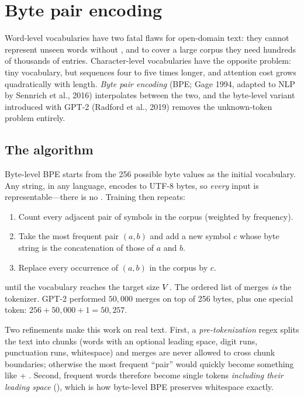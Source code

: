 \section{Byte pair encoding}\label{sec:text:bpe}

Word-level vocabularies have two fatal flaws for open-domain text: they cannot represent unseen
words without , and to cover a large corpus they need hundreds of thousands of entries.
Character-level vocabularies have the opposite problem: tiny vocabulary, but sequences four to
five times longer, and attention cost grows quadratically with length. \emph{Byte pair encoding}
(BPE; Gage 1994, adapted to NLP by Sennrich et al., 2016) interpolates between the two, and the
byte-level variant introduced with GPT-2 (Radford et al., 2019) removes the unknown-token problem
entirely.

\subsection{The algorithm}
Byte-level BPE starts from the 256 possible byte values as the initial vocabulary. Any string,
in any language, encodes to UTF-8 bytes, so \emph{every} input is representable---there is no
. Training then repeats:
\begin{enumerate}
  \item Count every adjacent pair of symbols in the corpus (weighted by frequency).
  \item Take the most frequent pair $(a,b)$ and add a new symbol $c$ whose byte string is the concatenation of those of $a$ and $b$.
  \item Replace every occurrence of $(a,b)$ in the corpus by $c$.
\end{enumerate}
until the vocabulary reaches the target size $V$. The ordered list of merges \emph{is} the
tokenizer. GPT-2 performed $50{,}000$ merges on top of 256 bytes, plus one special token:
$256+50{,}000+1=50{,}257$.

Two refinements make this work on real text. First, a \emph{pre-tokenization} regex splits the
text into chunks (words with an optional leading space, digit runs, punctuation runs, whitespace)
and merges are never allowed to cross chunk boundaries; otherwise the most frequent ``pair'' would
quickly become something like  + . Second, frequent words therefore become
single tokens \emph{including their leading space} (), which is how byte-level BPE
preserves whitespace exactly.

